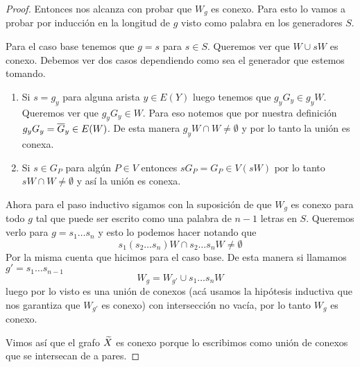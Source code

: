\documentclass[tesis.tex]{subfiles}
\begin{document}
\begin{proof}
	
	Entonces nos alcanza con probar que $W_{g}$ es conexo.
	Para esto lo vamos a probar por inducción en la longitud de $g$ visto como palabra en los generadores $S$.
	
	Para el caso base tenemos que $g = s$ para $s \in S$.
	Queremos ver que $W \cup sW$ es conexo.
	Debemos ver dos casos dependiendo como sea el generador que estemos tomando.
	\begin{enumerate}
		\item Si $s=g_y$ para alguna arista $y \in E(Y)$ luego tenemos que $g_yG_y \in g_{y}W$.
		Queremos ver que $g_{y}G_{y} \in W$.
		Para eso notemos que por nuestra definición	$g_yG_y  = \overline G_y \in E(W)$.
		De esta manera $g_yW \cap W \neq \emptyset$ y por lo tanto la unión es conexa.		
		
		\item Si $s \in G_P$ para algún $P \in V$ entonces $s G_P = G_P \in V(sW)$ por lo tanto $sW \cap W \neq \emptyset$ y así la unión es conexa.
	\end{enumerate} 

	Ahora para el paso inductivo sigamos con la suposición de que $W_{g}$ es conexo para todo $g$ tal que puede ser escrito como una palabra de $n-1$ letras en $S$. 
	Queremos verlo para $g = s_1\dots s_n$ y esto lo podemos hacer notando que 
	\[
	s_1(s_2 \dots s_n) W \cap s_2 \dots s_{n} W \neq \emptyset 
	\]
	Por la misma cuenta que hicimos para el caso base.
	De esta manera si llamamos $g' = s_{1} \dots s_{n-1}$
	\[
		W_{g} = W_{g'} \cup s_{1}\dots s_{n}W
	\]
	luego por lo visto es una unión de conexos (acá usamos la hipótesis inductiva que nos garantiza que $W_{g'}$ es conexo) con intersección no vacía, por lo tanto $W_{g}$ es conexo.
	
	Vimos así que el grafo $\widetilde X$ es conexo porque lo escribimos como unión de conexos que se intersecan de a pares.
	

\end{proof}
\end{document}

